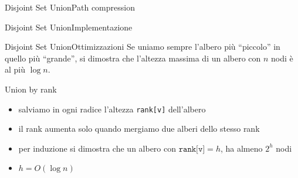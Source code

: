 \documentclass[compress]{beamer}
\begin{document}
\begin{frame}{Disjoint Set Union}{Path compression}
\end{frame}

\begin{frame}{Disjoint Set Union}{Implementazione}
\end{frame}

\begin{frame}{Disjoint Set Union}{Ottimizzazioni}
    Se uniamo sempre l'albero pi\`u ``piccolo'' in quello pi\`u ``grande'', si dimostra che l'altezza massima di un albero con $n$ nodi \`e al pi\`u $\log n$.
    \begin{block}{Union by rank}
        \begin{itemize}
            \item salviamo in ogni radice l'altezza \texttt{rank[v]} dell'albero
            \item il rank aumenta solo quando mergiamo due alberi dello stesso rank
            \item per induzione si dimostra che un albero con $\texttt{rank[v]} = h$, ha almeno $2^h$ nodi
            \item $h = O(\log n)$
        \end{itemize}
    \end{block}
\end{frame}
\end{document}
